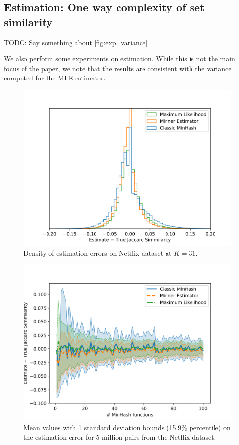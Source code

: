 \subsection{Estimation: One way complexity of set similarity}
\label{sec:estimation}

TODO: Say something about \cref{fig:exp_variance}

We also perform some experiments on estimation.
While this is not the main focus of the paper, we note that the results are consistent with the variance computed for the MLE estimator.

\begin{figure}
   \centering
   \includegraphics[trim=0 5 35 40,clip,width=\linewidth]{figures/hist2}
\caption{Density of estimation errors on Netflix dataset at $K=31$.
}
\end{figure}

\begin{figure}
   \centering
   \includegraphics[trim=0 0 35 40,clip,width=\linewidth]{figures/var2}
   \caption{
      Mean values with 1 standard deviation bounds (15.9\% percentile)
      on the estimation error for 5 million pairs from the Netflix dataset.
   }
   \label{fig:var}
\end{figure}
